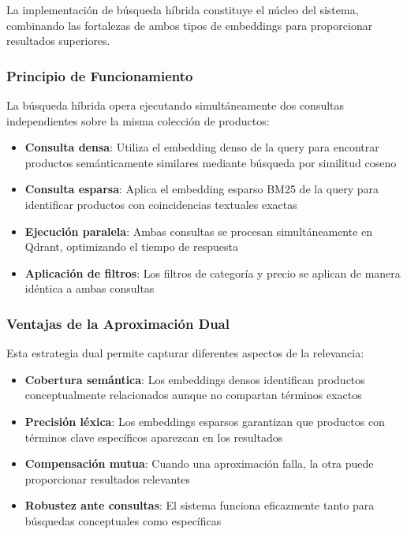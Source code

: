La implementación de búsqueda híbrida constituye el núcleo del sistema, combinando las fortalezas de ambos tipos de embeddings para proporcionar resultados superiores.

\subsubsection{Principio de Funcionamiento}

La búsqueda híbrida opera ejecutando simultáneamente dos consultas independientes sobre la misma colección de productos:

\begin{itemize}
    \item \textbf{Consulta densa}: Utiliza el embedding denso de la query para encontrar productos semánticamente similares mediante búsqueda por similitud coseno
    \item \textbf{Consulta esparsa}: Aplica el embedding esparso BM25 de la query para identificar productos con coincidencias textuales exactas
    \item \textbf{Ejecución paralela}: Ambas consultas se procesan simultáneamente en Qdrant, optimizando el tiempo de respuesta
    \item \textbf{Aplicación de filtros}: Los filtros de categoría y precio se aplican de manera idéntica a ambas consultas
\end{itemize}

\subsubsection{Ventajas de la Aproximación Dual}

Esta estrategia dual permite capturar diferentes aspectos de la relevancia:

\begin{itemize}
    \item \textbf{Cobertura semántica}: Los embeddings densos identifican productos conceptualmente relacionados aunque no compartan términos exactos
    \item \textbf{Precisión léxica}: Los embeddings esparsos garantizan que productos con términos clave específicos aparezcan en los resultados
    \item \textbf{Compensación mutua}: Cuando una aproximación falla, la otra puede proporcionar resultados relevantes
    \item \textbf{Robustez ante consultas}: El sistema funciona eficazmente tanto para búsquedas conceptuales como específicas
\end{itemize}

